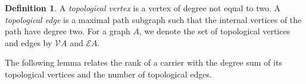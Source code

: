 \documentclass[article, 12pt]{amsart}
\numberwithin{equation}{section}
\newtheorem{theorem}{Theorem}[section]
\theoremstyle{definition}
\newtheorem{definition}[theorem]{Definition}
\newtheorem{remark}[theorem]{Remark}
\newcommand{\bbN}{\mathbb{N}}
\newcommand{\calE}{\mathcal{E}}
\newcommand{\calV}{\mathcal{V}}
\DeclareMathOperator{\bdelta}{\boldsymbol{\delta}}
\begin{document}



\begin{definition}
    A \emph{topological vertex} is a vertex of degree not equal to two.
    A \emph{topological edge} is a maximal path subgraph such that the internal vertices of the path have degree two.
    For a graph $A$, we denote the set of topological vertices and edges by $\calV A$ and $\calE A$.
\end{definition}

The following lemma relates the rank of a carrier with the degree sum of its topological vertices and the number of topological edges.
\end{document}
